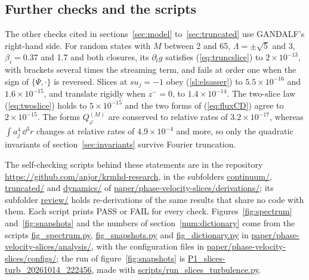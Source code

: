 \subsection{Further checks and the scripts}\label{num:rhs}

The other checks cited in sections~\ref{sec:model} to~\ref{sec:truncated} use GANDALF's right-hand side. For random states with $M$ between 2 and 65, $\Lambda=\pm\sqrt5$ and 3, $\beta_i=0.37$ and 1.7 and both closures, its $\partial_tg$ satisfies (\ref{eq:truncslice}) to $2\times10^{-13}$, with brackets several times the streaming term, and fails at order one when the sign of $\{\Psi,\cdot\}$ is reversed. Slices at $su_j=-1$ obey (\ref{sl:elsasser}) to $5.5\times10^{-16}$ and $1.6\times10^{-15}$, and translate rigidly when $z^-=0$, to $1.4\times10^{-14}$. The two-slice law (\ref{eq:twoslice}) holds to $5\times10^{-15}$ and the two forms of (\ref{eq:fluxCD}) agree to $2\times10^{-15}$. The forms $Q^{(M)}_\varphi$ are conserved to relative rates of $3.2\times10^{-17}$, whereas $\int a_j^4\,\dd^3r$ changes at relative rates of $4.9\times10^{-4}$ and more, so only the quadratic invariants of section~\ref{sec:invariants} survive Fourier truncation.

The self-checking scripts behind these statements are in the repository \url{https://github.com/anjor/krmhd-research}, in the subfolders \url{continuum/}, \url{truncated/} and \url{dynamics/} of \url{paper/phase-velocity-slices/derivations/}; its subfolder \url{review/} holds re-derivations of the same results that share no code with them. Each script prints PASS or FAIL for every check. Figures~\ref{fig:spectrum} and~\ref{fig:snapshots} and the numbers of section~\ref{num:dictionary} come from the scripts \url{fig_spectrum.py}, \url{fig_snapshots.py} and \url{fig_dictionary.py} in \url{paper/phase-velocity-slices/analysis/}, with the configuration files in \url{paper/phase-velocity-slices/configs/}; the run of figure~\ref{fig:snapshots} is \url{P1_slices-turb_20261014_222456}, made with \url{scripts/run_slices_turbulence.py}.
